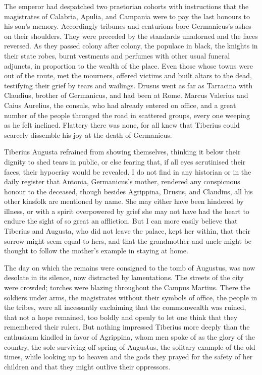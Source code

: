 
The emperor had despatched two praetorian cohorts with instructions that the magistrates of Calabria, Apulia, and Campania were to pay the last honours to his son's memory. Accordingly tribunes and centurions bore Germanicus's ashes on their shoulders. They were preceded by the standards unadorned and the faces reversed. As they passed colony after colony, the populace in black, the knights in their state robes, burnt vestments and perfumes with other usual funeral adjuncts, in proportion to the wealth of the place. Even those whose towns were out of the route, met the mourners, offered victims and built altars to the dead, testifying their grief by tears and wailings. Drusus went as far as Tarracina with Claudius, brother of Germanicus, and had been at Rome. Marcus Valerius and Caius Aurelius, the consuls, who had already entered on office, and a great number of the people thronged the road in scattered groups, every one weeping as he felt inclined. Flattery there was none, for all knew that Tiberius could scarcely dissemble his joy at the death of Germanicus.


Tiberius Augusta refrained from showing themselves, thinking it below their dignity to shed tears in public, or else fearing that, if all eyes scrutinised their faces, their hypocrisy would be revealed. I do not find in any historian or in the daily register that Antonia, Germanicus's mother, rendered any conspicuous honour to the deceased, though besides Agrippina, Drusus, and Claudius, all his other kinsfolk are mentioned by name. She may either have been hindered by illness, or with a spirit overpowered by grief she may not have had the heart to endure the sight of so great an affliction. But I can more easily believe that Tiberius and Augusta, who did not leave the palace, kept her within, that their sorrow might seem equal to hers, and that the grandmother and uncle might be thought to follow the mother's example in staying at home.


The day on which the remains were consigned to the tomb of Augustus, was now desolate in its silence, now distracted by lamentations. The streets of the city were crowded; torches were blazing throughout the Campus Martius. There the soldiers under arms, the magistrates without their symbols of office, the people in the tribes, were all incessantly exclaiming that the commonwealth was ruined, that not a hope remained, too boldly and openly to let one think that they remembered their rulers. But nothing impressed Tiberius more deeply than the enthusiasm kindled in favor of Agrippina, whom men spoke of as the glory of the country, the sole surviving off spring of Augustus, the solitary example of the old times, while looking up to heaven and the gods they prayed for the safety of her children and that they might outlive their oppressors.

